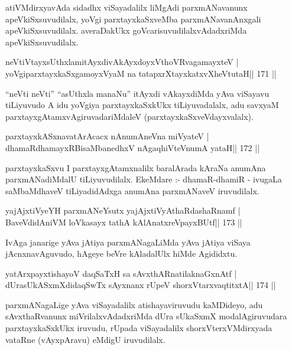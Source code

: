 \begin{artha}
atiVMdirxyavAda sidadhx viSayadalilx liMgAdi parxmANavanunx apeVkiSxsuvudilalx, yoVgi parxtayxkaSxveMba parxmANavanAnxgali apeVkiSxsuvudilalx. averaDakUkx goVcarisuvudilalxvAdadxriMda apeVkiSxsuvudilalx.
\end{artha}

\begin{shl}
neVtiVtayxsUthxlamitAyxdivAkAyxdoyxV\s thoVR\s vagamayxteV |
yoVgiparxtayxkaSxgamoyxV\s yaM na tatapxrXtayxkatxvXheVtutaH\hfill || 171 ||
\end{shl}

\begin{artha}
``neVti neVti'' ``asUthxla manaNu'' itAyxdi vAkayxdiMda yAva viSayavu tiLiyuvudo A idu yoVgiya parxtayxkaSxkUkx tiLiyuvadalalx, adu savxyaM parxtayxgAtamxvAgiruvadariMdaleV (parxtayxkaSxveVdayxvalalx).
\end{artha}

\begin{shl}
parxtayxkASxnavatArAcacx nAnumAneVna miVyateV |
dhamaRdhamayxRBisaMbanedhxV nAgaqhiVteV\s numA yataH\hfill || 172 ||
\end{shl}

\begin{artha}
parxtayxkaSxvu I parxtayxgAtamxnalilx baralArada kAraNa anumAna parxmANadiMdalU tiLiyuvudilalx. EkeMdare :- dhamaR-dhamiR - ivugaLa saMbaMdhaveV tiLiyadidAdxga anumAna parxmANaveV iruvudilalx.
\end{artha}

\begin{shl}
yajAjxtiVyeYH parxmANeYsutx yajAjxtiVyAthaRdashaRnamf |
BaveVdidAniVM loVkasayx tathA kAlAnatxreV\s payxBUtf\hfill || 173 ||
\end{shl}

\begin{artha}
IvAga janarige yAva jAtiya parxmANagaLiMda yAva jAtiya viSaya jAcnxnavAguvudo, hAgeye beVre kAladalUlx hiMde Agididxtu.
\end{artha}

\begin{shl}
yatArxpayxtishayoV daqSaTxH sa sAvxthARnatilaknaGxnAtf |
dUrasUkASxmXdidaqSwTx sAyxnanx rUpeV shorxVtarxvaqtitxtA\hfill || 174 ||
\end{shl}

\begin{artha}
parxmANagaLige yAva viSayadalilx atishayaviruvudu kaMDideyo, adu sAvxthaRvanunx miVrilalxvAdadxriMda dUra sUkaSxmX modalAgiruvudara parxtayxkaSxkUkx iruvudu, rUpada viSayadalilx shorxVterxVMdirxyada vataRne (vAyxpAravu) eMdigU iruvudilalx.
\end{artha}

